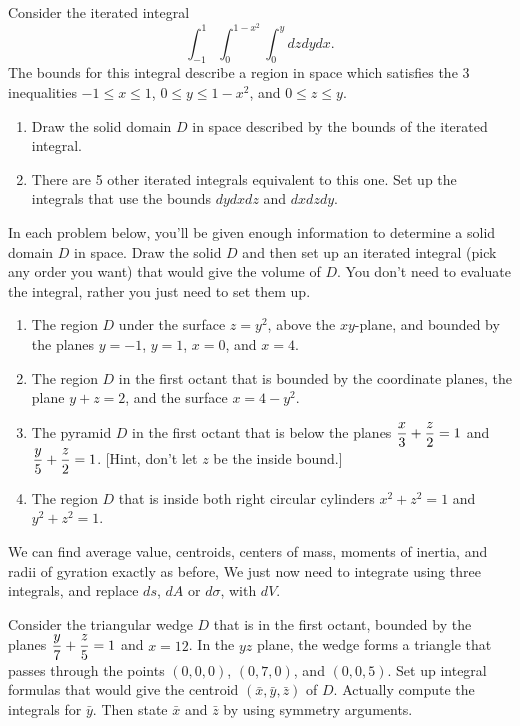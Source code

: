 \begin{problem}
Consider the iterated integral $$\int_{-1}^1\int_0^{1-x^2}\int_0^{y} dzdydx.$$
The bounds for this integral describe a region in space which satisfies the 3 inequalities $-1\leq x\leq 1$, $0\leq y\leq 1-x^2$, and $0\leq z\leq y$.
\begin{enumerate}
 \item Draw the solid domain $D$ in space described by the bounds of the iterated integral.
 \item There are 5 other iterated integrals equivalent to this one. Set up the integrals that use the bounds $dydxdz$ and $dxdzdy$.   
\end{enumerate}
\end{problem}



\begin{problem}
 In each problem below, you'll be given enough information to determine a solid domain $D$ in space. Draw the solid $D$ and then set up an iterated integral (pick any order you want) that would give the volume of $D$.  You don't need to evaluate the integral, rather you just need to set them up.
\begin{enumerate}
 \item The region $D$ under the surface $z=y^2$, above the $xy$-plane, and bounded by the planes $y=-1$, $y=1$, $x=0$, and $x=4$.
 \item The region $D$ in the first octant that is bounded by the coordinate planes, the plane $y+z=2$, and the surface $x=4-y^2$.
 \item The pyramid $D$ in the first octant that is below the planes $\displaystyle\frac{x}{3}+\frac{z}{2}=1$ and $\displaystyle\frac{y}{5}+\frac{z}{2}=1$. [Hint, don't let $z$ be the inside bound.]
 \item The region $D$ that is inside both right circular cylinders $x^2+z^2=1$ and $y^2+z^2=1$.
\end{enumerate}
\end{problem}

We can find average value, centroids, centers of mass, moments of inertia, and radii of gyration exactly as before,  We just now need to integrate using three integrals, and replace $ds$, $dA$ or $d\sigma$, with $dV$.  
\begin{problem}
 Consider the triangular wedge $D$ that is in the first octant, bounded by the planes $\displaystyle\frac{y}{7}+\frac{z}{5}=1$ and $x=12$. In the $yz$ plane, the wedge forms a triangle that passes through the points $(0,0,0)$,  $(0,7,0)$, and $(0,0,5)$.  Set up integral formulas that would give the centroid $(\bar x,\bar y, \bar z)$ of $D$.  Actually compute the integrals for $\bar y$. Then state $\bar x$ and $\bar z$ by using symmetry arguments.
\end{problem}


